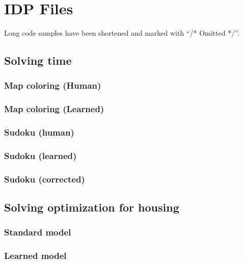 \chapter{IDP Files}

Long code samples have been shortened and marked with ``/* Omitted */''. 

\section{Solving time}
\label{app:solving_human}
\subsection{Map coloring (Human)}


\subsection{Map coloring (Learned)}


\subsection{Sudoku (human)}


\subsection{Sudoku (learned)}


\subsection{Sudoku (corrected)}


\section{Solving optimization for housing}
\label{app:co_idp}
\subsection{Standard model}


\subsection{Learned model}

